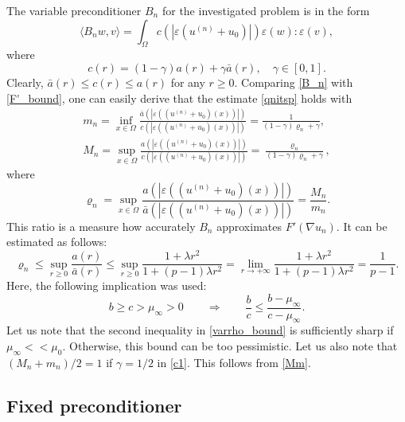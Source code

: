\documentclass[12pt]{article}
\numberwithin{equation}{section}
\begin{document}
The variable preconditioner $B_n$ for the investigated problem is in the form
\begin{equation}
\langle B_n w,v\rangle=\int_{\Omega}c(|\varepsilon(u^{(n)}+u_0)|)\varepsilon(w):\varepsilon(v),
\label{B_n}
\end{equation}
where 
\begin{equation}
	c(r)=(1-\gamma)a(r)+\gamma\bar a(r),\quad \gamma\in[0,1].
	\label{c1}
\end{equation} 
Clearly, $\bar a(r)\leq c(r)\leq a(r)$ for any $r\geq0$. Comparing \eqref{B_n} with \eqref{F'_bound}, one can easily derive that the estimate 
\eqref{qnitsp} holds with 
\begin{equation}
	\begin{array}{l}
m_n=\inf\limits_{x\in\Omega}\frac{\bar a(|\varepsilon((u^{(n)}+u_0)(x))|)}{c(|\varepsilon((u^{(n)}+u_0)(x))|)}=\frac{1}{(1-\gamma)\varrho_n+\gamma},\\[3mm]
M_n=\sup\limits_{x\in\Omega}\frac{a(|\varepsilon((u^{(n)}+u_0)(x))|)}{c(|\varepsilon((u^{(n)}+u_0)(x))|)}=\frac{\varrho_n}{(1-\gamma)\varrho_n+\gamma},
	\end{array}
	\label{Mm}
\end{equation}
where
\begin{equation}
	\varrho_n=\sup_{x\in\Omega}\frac{a(|\varepsilon((u^{(n)}+u_0)(x))|)}{\bar a(|\varepsilon((u^{(n)}+u_0)(x))|)}=\frac{M_n}{m_n}.
	\label{varrho}
\end{equation}
This ratio is a measure how accurately $B_n$ approximates $F'(\nabla u_n)$. It can be estimated as follows:
\begin{equation}
	\varrho_n\leq\sup_{r\geq0}\frac{a(r)}{\bar a(r)}\leq \sup_{r\geq0}\frac{1+\lambda r^2}{1+(p-1)\lambda r^2}=\lim_{r\rightarrow+\infty}\frac{1+\lambda r^2}{1+(p-1)\lambda r^2}=\frac{1}{p-1}.
	\label{varrho_bound}
\end{equation}
Here, the following implication was used:
$$b\geq c>\mu_\infty>0\qquad\Longrightarrow\qquad \frac bc\leq\frac{b-\mu_\infty}{c-\mu_\infty}.$$
Let us note that the second inequality in \eqref{varrho_bound} is sufficiently sharp if $\mu_\infty<<\mu_0$. Otherwise, this bound can be too pessimistic. Let us also note that $(M_n+m_n)/2=1$ if $\gamma=1/2$ in \eqref{c1}. This follows from \eqref{Mm}.

\subsection{Fixed preconditioner}
\end{document}
